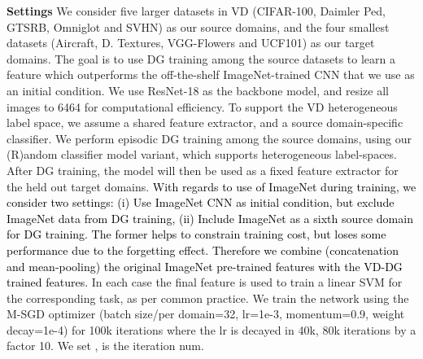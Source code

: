 \documentclass[10pt,twocolumn,letterpaper]{article}
\newcommand{\doublecheck}[1]{\textcolor{black}{#1}}
\newcommand{\keypoint}[1]{\vspace{0.1cm}\noindent\textbf{#1}\quad}
\newcommand{\cut}[1]{}
\begin{document}
\keypoint{Settings}  We consider  five larger datasets in VD (CIFAR-100, Daimler Ped, GTSRB, Omniglot and SVHN\cut{, excluding ImageNet\footnote{We always exploit ImageNet as an initial condition, but do not include it in DG training for computational feasibility}}) as our source domains, and the four smallest datasets (Aircraft, D. Textures, VGG-Flowers and UCF101) as our target domains. The goal is to use DG training among the source datasets to learn a feature which outperforms the off-the-shelf ImageNet-trained CNN that we use as an initial condition. We use ResNet-18 \cite{He2016resnet} as the backbone model, and resize all  images to 6464 for computational efficiency. To support the VD heterogeneous label space, we assume a shared feature extractor, and a source domain-specific classifier. We perform episodic DG training among the source domains, using our (R)andom classifier model variant, which supports heterogeneous label-spaces. After DG training, the model will then be used as a fixed feature extractor for the held out target domains. \doublecheck{With regards to use of ImageNet during training, we consider two settings: (i) Use ImageNet CNN as initial condition, but exclude ImageNet data from DG training, (ii) Include ImageNet as a sixth source domain for DG training. The former helps to constrain training cost, but loses some performance due to the forgetting effect. Therefore we combine (concatenation and mean-pooling) the original ImageNet pre-trained features with the VD-DG trained features. }
\cut{These are combined by combination (concatenation and mean-pooling) with the original ImageNet pre-trained features\footnote{Since ImageNet is excluded from source domains for computational feasibility, there is loss of performance for all models compared to the original feature due to the forgetting effect.}} In each case the final feature is used to train a linear SVM for the corresponding task, as per common practice. We train the network using the M-SGD optimizer (batch size/per domain=32, lr=1e-3, momentum=0.9, weight decay=1e-4) for 100k iterations where the lr is decayed in 40k, 80k iterations by a factor 10. We set ,  is the iteration num. 
\end{document}
